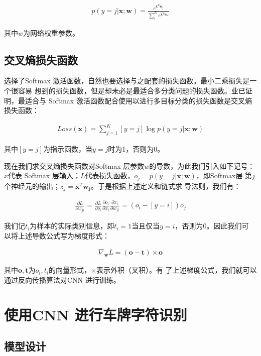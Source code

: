 \begin{align}
p(y=j|\mathbf{x};\mathbf{w}) = \frac{e^{\mathbf{x}^T\mathbf{w}_j}}{\sum_{i}^{K}{e^{\mathbf{x}^T\mathbf{w}_k}}}
\end{align}

其中$w$为网络权重参数。

\subsection{交叉熵损失函数}

选择了Softmax 激活函数，自然也要选择与之配套的损失函数。最小二乘损失是一个很容易
想到的损失函数，但是却未必是最适合多分类问题的损失函数。业已证明，最适合与
Softmax 激活函数配合使用以进行多目标分类的损失函数是交叉熵损失函数：

\begin{align}
Loss(\mathbf{x}) = \sum_{j=1}^{K}[y = j]\log{p(y=j|\mathbf{x};\mathbf{w})}
\end{align}

其中$[y = j]$为指示函数，当$y = j$时为1，否则为0。

现在我们求交叉熵损失函数对Softmax 层参数$w$的导数，为此我们引入如下记号：$x$代表
Softmax 层输入；$L$代表损失函数，$o_j = p(y=j|\mathbf{x};\mathbf{w})$，即Softmax层
第$j$个神经元的输出；$z_j = \mathbf{x}^T\mathbf{w_j}$。于是根据上述定义和链式求
导法则，我们有：

\begin{align}
\frac{\partial{L}}{\partial{w_{ji}}}  = 
\frac{\partial{L}}{\partial{o_i}}\frac{\partial{o_i}}{\partial{x_i}}\frac{\partial{x_i}}{\partial{w_{ji}}}
=  (o_i-[y = i])o_j
\end{align}

我们记$t_i$为样本的实际类别信息，即$t_i = 1$当且仅当$y = i$，否则为0。因此我们可
以将上述导数公式写为梯度形式：

\begin{align}
\nabla_{\mathbf{w}}{L} = (\mathbf{o} - \mathbf{t}) \times \mathbf{o}
\end{align}

其中$\mathbf{o}, \mathbf{t}$为$o_i, t_i$的向量形式，$\times$表示外积（叉积）。有
了上述梯度公式，我们就可以通过反向传播算法对CNN 进行训练。

\section{使用CNN 进行车牌字符识别}

\subsection{模型设计}

